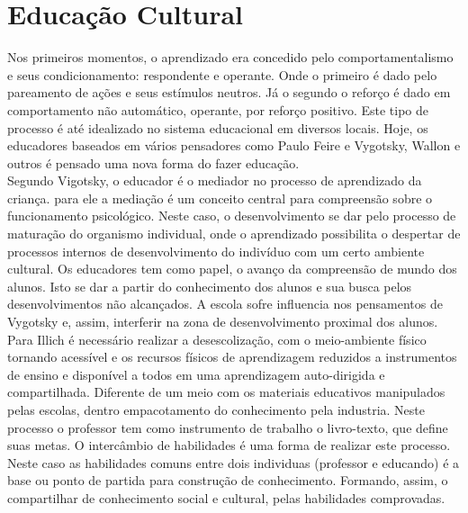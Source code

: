 \section*{Educação Cultural}
\hspace{1.5cm}
Nos primeiros momentos, o aprendizado era concedido pelo comportamentalismo e seus condicionamento: respondente e operante. Onde o primeiro é dado pelo pareamento de ações  e seus estímulos neutros. Já o segundo o reforço é dado em comportamento não automático, operante, por reforço positivo. Este tipo de processo é até idealizado no sistema educacional em diversos locais.  Hoje, os educadores baseados em vários pensadores como Paulo Feire e Vygotsky, Wallon e outros é pensado uma nova forma do fazer educação.\\

\hspace{1.5cm}
Segundo Vigotsky\cite{marta}, o educador é o mediador no processo de aprendizado da criança. para ele a mediação é um conceito central para compreensão sobre o funcionamento psicológico. Neste caso, o desenvolvimento se dar pelo processo de maturação do organismo individual, onde o aprendizado possibilita o despertar de processos internos de desenvolvimento do indivíduo com um certo ambiente cultural. Os educadores tem como papel, o avanço da compreensão de mundo dos alunos. Isto se dar a partir do conhecimento  dos alunos e sua busca pelos desenvolvimentos não alcançados. A escola sofre influencia nos pensamentos de Vygotsky e, assim, interferir na zona de desenvolvimento proximal dos alunos.\\

\hspace{1.5cm}
Para Illich\cite{illich} é necessário realizar a desescolização, com o meio-ambiente físico tornando acessível e os recursos físicos de aprendizagem reduzidos a instrumentos de ensino e disponível a todos em uma aprendizagem auto-dirigida e compartilhada. Diferente de um meio com os materiais educativos manipulados pelas escolas, dentro empacotamento do conhecimento pela industria. Neste processo o professor tem como instrumento de trabalho o livro-texto, que define suas metas. O intercâmbio de habilidades é uma forma de realizar este processo. Neste caso as habilidades comuns entre dois individuas (professor e educando) é a base ou ponto de partida para construção de conhecimento. Formando, assim, o compartilhar de conhecimento social e cultural, pelas habilidades comprovadas.\\

